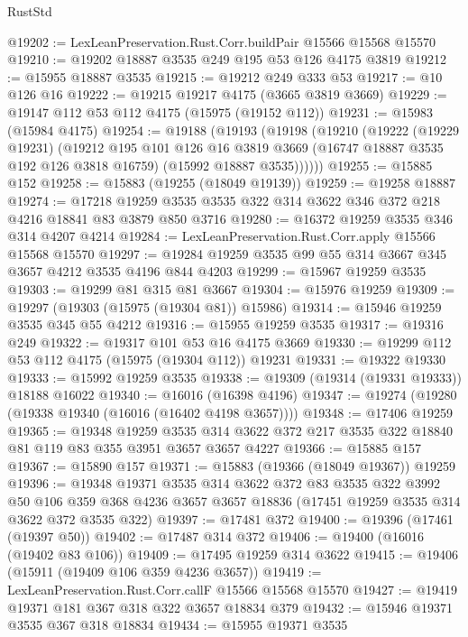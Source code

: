 \begin{lexlean}{RustStd}
\begin{coremodule}
@19202 := LexLeanPreservation.Rust.Corr.buildPair @15566 @15568 @15570
@19210 := @19202 @18887 @3535 @249 @195 @53 @126 @4175 @3819
@19212 := @15955 @18887 @3535
@19215 := @19212 @249 @333 @53
@19217 := @10 @126 @16
@19222 := @19215 @19217 @4175 (@3665 @3819 @3669)
@19229 := @19147 @112 @53 @112 @4175 (@15975 (@19152 @112))
@19231 := @15983 (@15984 @4175)
@19254 := @19188
    (@19193
      (@19198
        (@19210
          (@19222
            (@19229 @19231)
            (@19212
              @195
              @101
              @126
              @16
              @3819
              @3669
              (@16747 @18887 @3535 @192 @126 @3818 @16759)
              (@15992 @18887 @3535))))))
@19255 := @15885 @152
@19258 := @15883 (@19255 (@18049 @19139))
@19259 := @19258 @18887
@19274 := @17218 @19259 @3535 @3535 @322 @314 @3622 @346 @372 @218 @4216 @18841 @83 @3879 @850 @3716
@19280 := @16372 @19259 @3535 @346 @314 @4207 @4214
@19284 := LexLeanPreservation.Rust.Corr.apply @15566 @15568 @15570
@19297 := @19284 @19259 @3535 @99 @55 @314 @3667 @345 @3657 @4212 @3535 @4196 @844 @4203
@19299 := @15967 @19259 @3535
@19303 := @19299 @81 @315 @81 @3667
@19304 := @15976 @19259
@19309 := @19297 (@19303 (@15975 (@19304 @81)) @15986)
@19314 := @15946 @19259 @3535 @345 @55 @4212
@19316 := @15955 @19259 @3535
@19317 := @19316 @249
@19322 := @19317 @101 @53 @16 @4175 @3669
@19330 := @19299 @112 @53 @112 @4175 (@15975 (@19304 @112)) @19231
@19331 := @19322 @19330
@19333 := @15992 @19259 @3535
@19338 := @19309 (@19314 (@19331 @19333)) @18188 @16022
@19340 := @16016 (@16398 @4196)
@19347 := @19274 (@19280 (@19338 @19340 (@16016 (@16402 @4198 @3657))))
@19348 := @17406 @19259
@19365 := @19348
    @19259
    @3535
    @314
    @3622
    @372
    @217
    @3535
    @322
    @18840
    @81
    @119
    @83
    @355
    @3951
    @3657
    @3657
    @4227
@19366 := @15885 @157
@19367 := @15890 @157
@19371 := @15883 (@19366 (@18049 @19367)) @19259
@19396 := @19348
    @19371
    @3535
    @314
    @3622
    @372
    @83
    @3535
    @322
    @3992
    @50
    @106
    @359
    @368
    @4236
    @3657
    @3657
    @18836
    (@17451 @19259 @3535 @314 @3622 @372 @3535 @322)
@19397 := @17481 @372
@19400 := @19396 (@17461 (@19397 @50))
@19402 := @17487 @314 @372
@19406 := @19400 (@16016 (@19402 @83 @106))
@19409 := @17495 @19259 @314 @3622
@19415 := @19406 (@15911 (@19409 @106 @359 @4236 @3657))
@19419 := LexLeanPreservation.Rust.Corr.callF @15566 @15568 @15570
@19427 := @19419 @19371 @181 @367 @318 @322 @3657 @18834 @379
@19432 := @15946 @19371 @3535 @367 @318 @18834
@19434 := @15955 @19371 @3535

\end{coremodule}
\end{lexlean}
